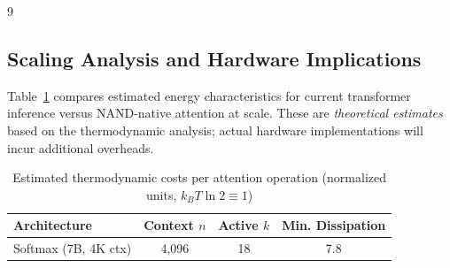 \documentclass[11pt]{article}
\theoremstyle{definition}
\begin{document}
\begin{thebibliography}{9}
{{{\subsection{Scaling Analysis and Hardware Implications}













Table~\ref{tab:thermo-scaling} compares estimated energy characteristics for current transformer inference versus NAND-native attention at scale. These are \emph{theoretical estimates} based on the thermodynamic analysis; actual hardware implementations will incur additional overheads.













\begin{table}[h]






\centering






\caption{Estimated thermodynamic costs per attention operation (normalized units, $k_B T \ln 2 \equiv 1$)}






\label{tab:thermo-scaling}






\begin{tabular}{lccc}






\toprule






\textbf{Architecture} & \textbf{Context $n$} & \textbf{Active $k$} & \textbf{Min. Dissipation} \\






\midrule






Softmax (7B, 4K ctx) & 4,096 & 18 & 7.8 \\







\end{tabular}
\end{table}}}}
\end{thebibliography}
\end{document}
